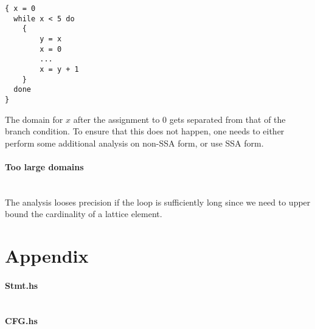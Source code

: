 \documentclass[a4paper]{article}
\newcommand{\NL}[0]{ \hfill\\\noindent }
\begin{document}
\begin{verbatim}
{ x = 0
  while x < 5 do
  	{
  		y = x
  		x = 0
  		...
  		x = y + 1
  	}
  done 
}
\end{verbatim}
\noindent The domain for $x$ after the assignment to $0$ gets separated from that of the branch condition. To ensure that this does not happen, one needs to either perform some additional analysis on non-SSA form, or use SSA form.

\paragraph{Too large domains}\NL
The analysis looses precision if the loop is sufficiently long since we need to upper bound the cardinality of a lattice element.

%

\newpage
\section{Appendix}
\paragraph{Stmt.hs}
\inputminted{haskell}{../src/Stmt.hs}
\newpage
\paragraph{CFG.hs}
\inputminted{haskell}{../src/CFG.hs}

\newpage
{}

\end{document}
